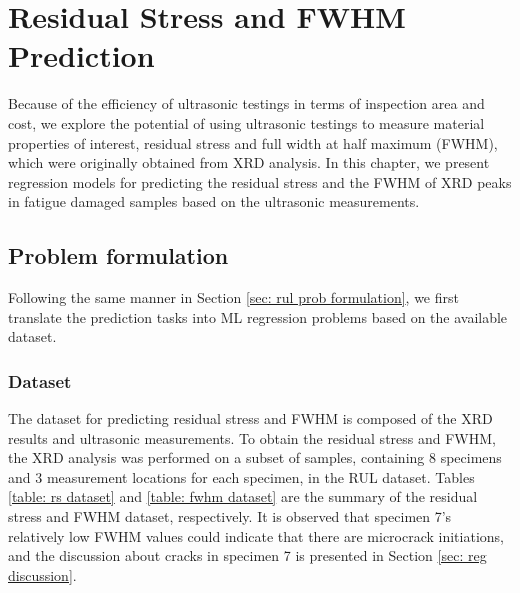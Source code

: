 \chapter{Residual Stress and FWHM Prediction}
\label{chap: reg}

Because of the efficiency of ultrasonic testings in terms of inspection area and cost, we explore the potential of using ultrasonic testings to measure material properties of interest, residual stress and full width at half maximum (FWHM), which were originally obtained from XRD analysis. In this chapter, we present regression models for predicting the residual stress and the FWHM of XRD peaks in fatigue damaged samples based on the ultrasonic measurements. 

\section{Problem formulation}
Following the same manner in Section \ref{sec: rul prob formulation}, we first translate the prediction tasks into ML regression problems based on the available dataset.

\subsection{Dataset}
The dataset for predicting residual stress and FWHM is composed of the XRD results and ultrasonic measurements. To obtain the residual stress and FWHM, the XRD analysis was performed on a subset of samples, containing 8 specimens and 3 measurement locations for each specimen, in the RUL dataset. Tables \ref{table: rs dataset} and \ref{table: fwhm dataset} are the summary of the residual stress and FWHM dataset, respectively. It is observed that specimen 7's relatively low FWHM values could indicate that there are microcrack initiations, and the discussion about cracks in specimen 7 is presented in Section \ref{sec: reg discussion}.

